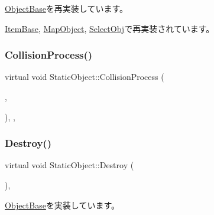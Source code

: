 \mbox{\hyperlink{class_object_base_a3e1db79dfa119be067d816c22d09839d}{Object\+Base}}を再実装しています。



\mbox{\hyperlink{class_item_base_ae5c2bcf78c74126a6f76783ca927c7ab}{Item\+Base}}, \mbox{\hyperlink{class_map_object_a76b9161f2723272ad361d0b190e46245}{Map\+Object}}, \mbox{\hyperlink{class_select_obj_a497ff683aefe9bf77201eee1e3948e15}{Select\+Obj}}で再実装されています。

\mbox{\label{class_static_object_a36379eb74b66c1586f1cc678a85c52c1}} 
\subsubsection{\texorpdfstring{Collision\+Process()}{CollisionProcess()}}
{\footnotesize\ttfamily virtual void Static\+Object\+::\+Collision\+Process (\begin{DoxyParamCaption}\item[{\mbox{\hyperlink{class_object_base}{Object\+Base}} $\ast$}]{,  }\item[{\mbox{\hyperlink{common_8h_ae148fff5818e9444b4ab2288829559bf}{Vec2}}}]{ }\end{DoxyParamCaption})\hspace{0.3cm}{\ttfamily [inline]}, {\ttfamily [protected]}, {\ttfamily [virtual]}}

\mbox{\label{class_static_object_a8e9fb321b4f8f12c4bec1bc66853512f}} 
\subsubsection{\texorpdfstring{Destroy()}{Destroy()}}
{\footnotesize\ttfamily virtual void Static\+Object\+::\+Destroy (\begin{DoxyParamCaption}{ }\end{DoxyParamCaption})\hspace{0.3cm}{\ttfamily [inline]}, {\ttfamily [virtual]}}



\mbox{\hyperlink{class_object_base_a7fa4c548153c3af20f89673ffea809af}{Object\+Base}}を実装しています。



